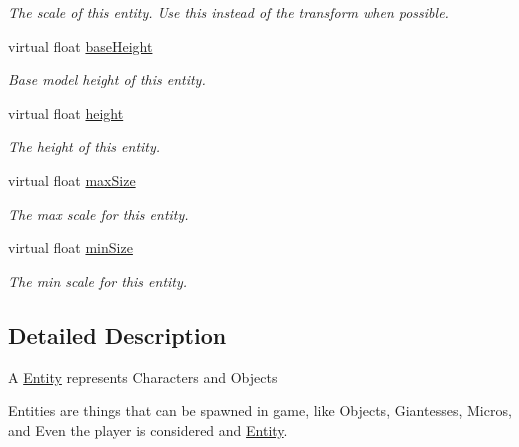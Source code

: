 \begin{DoxyCompactItemize}
\begin{DoxyCompactList}\small\item\em The scale of this entity. Use this instead of the transform when possible. \end{DoxyCompactList}\item 
virtual float \mbox{\hyperlink{class_lua_1_1_entity_a1873494f26c8f90c79254b43d25d47f7}{base\+Height}}
\begin{DoxyCompactList}\small\item\em Base model height of this entity. \end{DoxyCompactList}\item 
virtual float \mbox{\hyperlink{class_lua_1_1_entity_a6b6baf8292fe2447ad0620722bc24526}{height}}
\begin{DoxyCompactList}\small\item\em The height of this entity. \end{DoxyCompactList}\item 
virtual float \mbox{\hyperlink{class_lua_1_1_entity_a133133afe701b7ca4f0e2d6632beae33}{max\+Size}}
\begin{DoxyCompactList}\small\item\em The max scale for this entity. \end{DoxyCompactList}\item 
virtual float \mbox{\hyperlink{class_lua_1_1_entity_a642603e2952e4fcea70979837049f813}{min\+Size}}
\begin{DoxyCompactList}\small\item\em The min scale for this entity. \end{DoxyCompactList}\end{DoxyCompactItemize}


\subsection{Detailed Description}
A \mbox{\hyperlink{class_lua_1_1_entity}{Entity}} represents Characters and Objects 

Entities are things that can be spawned in game, like Objects, Giantesses, Micros, and Even the player is considered and \mbox{\hyperlink{class_lua_1_1_entity}{Entity}}. 

